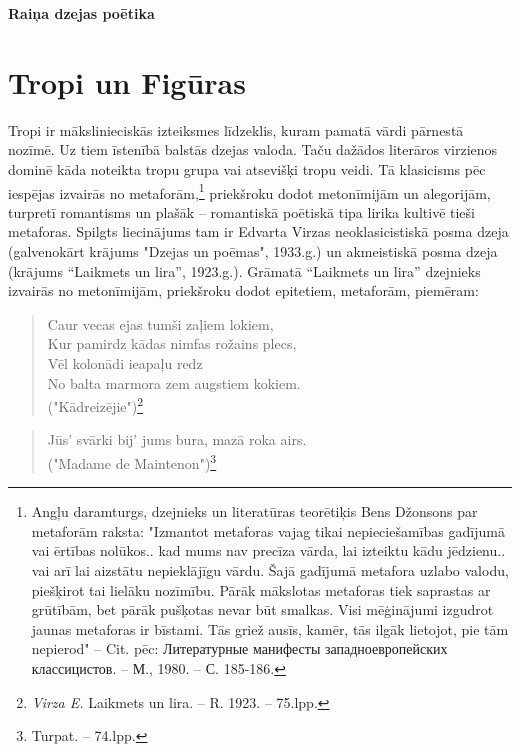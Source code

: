 \documentclass[11pt]{article}
\begin{document}
\begin{center}
{\LARGE \bf Raiņa dzejas poētika}
\end{center}



\section{Tropi un Figūras}

Tropi ir mākslinieciskās izteiksmes līdzeklis, kuram pamatā vārdi
pārnestā nozīmē. Uz tiem īstenībā balstās dzejas valoda. Taču dažādos
literāros virzienos dominē kāda noteikta tropu grupa vai atsevišķi
tropu veidi. Tā klasicisms pēc iespējas izvairās no
metaforām,\footnote{Angļu daramturgs, dzejnieks un literatūras
teorētiķis Bens Džonsons par metaforām raksta: "Izmantot metaforas
vajag tikai nepieciešamības gadījumā vai ērtības nolūkos.. kad mums nav
precīza vārda, lai izteiktu kādu jēdzienu.. vai arī lai aizstātu
nepieklājīgu vārdu. Šajā gadījumā metafora uzlabo valodu, piešķirot
tai lielāku nozīmību. Pārāk mākslotas metaforas tiek saprastas ar grūtībām,
bet pārāk pušķotas nevar būt smalkas. Visi mēģinājumi izgudrot jaunas
metaforas ir bīstami. Tās griež ausīs, kamēr, tās ilgāk lietojot,
pie tām nepierod" -- Cit. pēc: Литературные манифесты западноевропейских
классицистов. -- М., 1980. -- С. 185-186.}
priekšroku dodot metonīmijām un alegorijām, turpretī
romantisms un plašāk -- romantiskā poētiskā tipa lirika kultivē tieši
metaforas. Spilgts liecinājums tam ir Edvarta Virzas neoklasicistiskā
posma dzeja (galvenokārt krājums "Dzejas un poēmas", 1933.g.) un
akmeistiskā posma dzeja (krājums ``Laikmets un lira'', 1923.g.).
Grāmatā ``Laikmets un lira'' dzejnieks izvairās no metonīmijām,
priekšroku dodot epitetiem, metaforām, piemēram:


\begin{quote}
Caur vecas ejas tumši zaļiem lokiem, \\
Kur pamirdz kādas nimfas rožains plecs,\\
Vēl kolonādi ieapaļu redz\\
No balta marmora zem augstiem kokiem.\\
("Kādreizējie")\footnote{{\em Virza E.} Laikmets un lira. --
R. 1923. -- 75.lpp.}
\end{quote}


\begin{quote}
Jūs' svārki bij' jums bura, mazā roka airs.\\
("Madame de Maintenon")\footnote{Turpat. -- 74.lpp.}
\end{quote}
\end{document}
